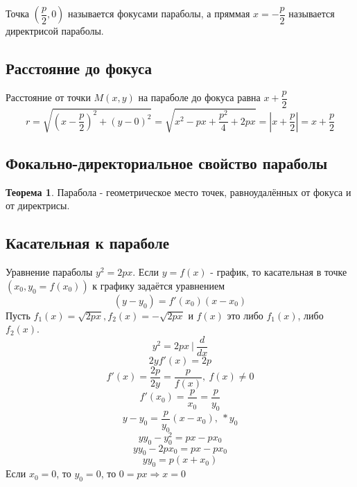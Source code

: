 \documentclass{article}
\theoremstyle{definition}
\newtheorem{theorem}{Теорема}[section]
\begin{document}
Точка $\left(\dfrac{p}{2}, 0\right)$ называется фокусами параболы, а пряммая $x = -\dfrac{p}{2}$ называется директрисой параболы.

\subsection{Расстояние до фокуса}

Расстояние от точки $M(x, y)$ на параболе до фокуса равна $x + \dfrac{p}{2}$
$$r = \sqrt{(x - \dfrac{p}{2})^2 + (y - 0)^2} = \sqrt{x^2 - p x + \dfrac{p^2}{4} + 2 p x} = \left\vert x + \dfrac{p}{2}\right\vert = x + \dfrac{p}{2}$$


\subsection{Фокально-директориальное свойство параболы}

\begin{theorem}

Парабола - геометрическое место точек, равноудалённых от фокуса и от директрисы.
\end{theorem}

\subsection{Касательная к параболе}

Уравнение параболы $y^2 = 2 p x$. Если $y = f(x)$ - график, то касательная в точке $(x_0, y_0 = f(x_0))$  к графику задаётся уравнением
$$(y - y_0) = f'(x_0)(x - x_0) $$
Пусть $f_1(x) = \sqrt{2 p x}, f_2(x) = - \sqrt{2 p x}$ и $f(x) $ это либо $f_1(x)$, либо $f_2(x)$.
$$y^2 = 2 p x \ | \ \frac{d}{d x}$$
$$2 y f'(x) = 2 p $$
$$f'(x) = \frac{2 p}{2 y} = \frac{p}{f(x)} , \ f(x) \neq 0$$
$$f'(x_0) = \frac{p}{x_0} = \frac{p}{y_0} $$
$$y - y_0 = \frac{p}{y_0} (x - x_0) , \ *y_0$$
$$y y_0 - y_0^2 = p x - p x_0 $$
$$y y_0 - 2 p x_0 = p x - p x_0 $$
$$y y_0 = p(x + x_0) $$
Если $x_0 = 0$, то $y_0  = 0$, то $0 = p x \Rightarrow x = 0$
\end{document}

